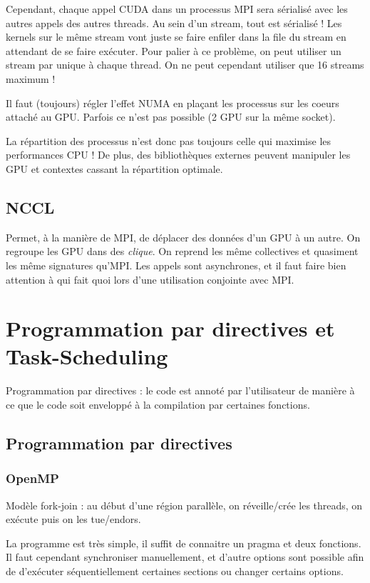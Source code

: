 \documentclass{article}
\begin{document}
Cependant, chaque appel CUDA dans un processus MPI sera sérialisé avec les autres appels des autres threads. Au sein d'un stream, tout est sérialisé ! Les kernels sur le même stream vont juste se faire enfiler dans la file du stream en attendant de se faire exécuter. Pour palier à ce problème, on peut utiliser un stream par unique à chaque thread. On ne peut cependant utiliser que 16 streams maximum !

Il faut (toujours) régler l'effet NUMA en plaçant les processus sur les coeurs attaché au GPU. Parfois ce n'est pas possible (2 GPU sur la même socket).

La répartition des processus n'est donc pas toujours celle qui maximise les performances CPU ! De plus, des bibliothèques externes peuvent manipuler les GPU et contextes cassant la répartition optimale.

\subsection{NCCL}
Permet, à la manière de MPI, de déplacer des données d'un GPU à un autre. On regroupe les GPU dans des \emph{clique}. On reprend les même collectives et quasiment les même signatures qu'MPI. Les appels sont asynchrones, et il faut faire bien attention à qui fait quoi lors d'une utilisation conjointe avec MPI.

\section{Programmation par directives et Task-Scheduling}
Programmation par directives : le code est annoté par l'utilisateur de manière à ce que le code soit enveloppé à la compilation par certaines fonctions.
\subsection{Programmation par directives}
\subsubsection{OpenMP}
Modèle fork-join : au début d'une région parallèle, on réveille/crée les threads, on exécute puis on les tue/endors.

La programme est très simple, il suffit de connaitre un pragma et deux fonctions. Il faut cependant synchroniser manuellement, et d'autre options sont possible afin de d'exécuter séquentiellement certaines sections ou changer certains options.
\end{document}
